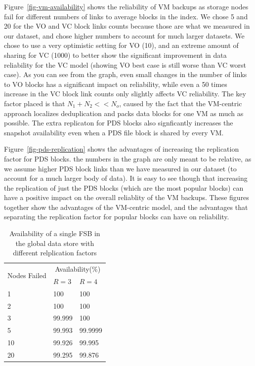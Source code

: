Figure~\ref{fig-vm-availability} shows the reliability of VM backups as storage
nodes fail for different numbers of links to average blocks in the index. We
chose 5 and 20 for the VO and VC block links counts because those are what we
measured in our dataset, and chose higher numbers to account for much larger
datasets. We chose to use a very optimistic setting for VO (10), and an extreme
amount of sharing for VC (1000) to better show the significant improvement in
data reliability for the VC model (showing VO best case is still worse than VC
worst case). As you can see from the graph, even small changes in the number of
links to VO blocks has a significant impact on reliability, while even a 50
times increase in the VC block link counts only slightly affects VC
reliability.  The key factor placed is that  $N_1 +N_2 << N_o$, caused by the
fact that the VM-centric approach localizes deduplication and packs  data
blocks for one VM as much as possible.  The extra replicaton for PDS blocks
also signficantly increases the snapshot availability even when a PDS file
block is shared by every VM.

Figure~\ref{fig-pds-replication}
shows the advantages of increasing the replication factor for PDS blocks. the
numbers in the graph are only meant to be relative, as we assume higher PDS
block links than we have measured in our dataset (to account for a much larger
body of data). It is easy to see though that increasing the replication of just
the PDS blocks (which are the most popular blocks) can have a positive impact
on the overall reliablity of the VM backups. These figures together show the
advantages of the VM-centric model, and the advantages that separating the
replication factor for popular blocks can have on reliability.

\begin{table}
    \begin{tabular}{|l|ll|}
    \hline
    \multirow{2}{*}{Nodes Failed}   & \multicolumn{2}{c|}{Availability(\%)}\\
                                    & $R=3$ & $R=4$\\
    \hline
    1           &  100      & 100\\
    2           & 100       & 100\\
    3          & 99.999     & 100\\
    5          & 99.993     & 99.9999\\
    10          & 99.926    & 99.995\\
    20          & 99.295    & 99.876\\
    \hline
    \end{tabular}
    \caption{Availability of a single FSB in the global data store with different relplication factors}
    \label{tab:fsb-availability}
\end{table}

